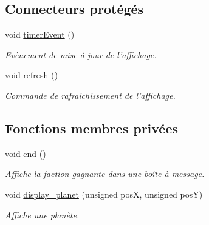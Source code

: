 \subsection*{Connecteurs protégés}
\begin{DoxyCompactItemize}
\item 
\hypertarget{classDisplayer_a560b41e509deb82d5ae56b5ff60e093c}{void \hyperlink{classDisplayer_a560b41e509deb82d5ae56b5ff60e093c}{timer\-Event} ()}\label{classDisplayer_a560b41e509deb82d5ae56b5ff60e093c}

\begin{DoxyCompactList}\small\item\em Evènement de mise à jour de l'affichage. \end{DoxyCompactList}\item 
\hypertarget{classDisplayer_a557745fd320fb608f4067ea3fcbf3a56}{void \hyperlink{classDisplayer_a557745fd320fb608f4067ea3fcbf3a56}{refresh} ()}\label{classDisplayer_a557745fd320fb608f4067ea3fcbf3a56}

\begin{DoxyCompactList}\small\item\em Commande de rafraichissement de l'affichage. \end{DoxyCompactList}\end{DoxyCompactItemize}
\subsection*{Fonctions membres privées}
\begin{DoxyCompactItemize}
\item 
\hypertarget{classDisplayer_a64736a6c3bf40f87fb54562dcdb51b21}{void \hyperlink{classDisplayer_a64736a6c3bf40f87fb54562dcdb51b21}{end} ()}\label{classDisplayer_a64736a6c3bf40f87fb54562dcdb51b21}

\begin{DoxyCompactList}\small\item\em Affiche la faction gagnante dans une boîte à message. \end{DoxyCompactList}\item 
void \hyperlink{classDisplayer_a4b66ff00950bc1d57bffa61a767c0303}{display\-\_\-planet} (unsigned pos\-X, unsigned pos\-Y)
\begin{DoxyCompactList}\small\item\em Affiche une planète. \end{DoxyCompactList}\end{DoxyCompactItemize}
